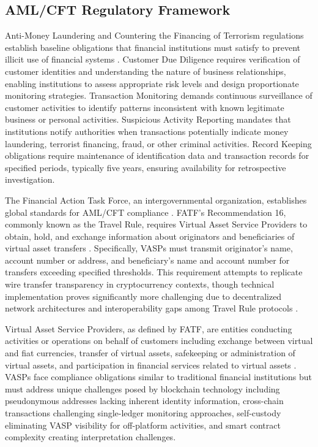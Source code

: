 \documentclass[conference,compsoc]{IEEEtran}
\begin{document}
\subsection{AML/CFT Regulatory Framework}

Anti-Money Laundering and Countering the Financing of Terrorism regulations establish baseline obligations that financial institutions must satisfy to prevent illicit use of financial systems \cite{financialactiontaskforcefatf2012internationalstandardscombating}. Customer Due Diligence requires verification of customer identities and understanding the nature of business relationships, enabling institutions to assess appropriate risk levels and design proportionate monitoring strategies. Transaction Monitoring demands continuous surveillance of customer activities to identify patterns inconsistent with known legitimate business or personal activities. Suspicious Activity Reporting mandates that institutions notify authorities when transactions potentially indicate money laundering, terrorist financing, fraud, or other criminal activities. Record Keeping obligations require maintenance of identification data and transaction records for specified periods, typically five years, ensuring availability for retrospective investigation.

The Financial Action Task Force, an intergovernmental organization, establishes global standards for AML/CFT compliance \cite{financialactiontaskforcefatf2012internationalstandardscombating}. FATF's Recommendation 16, commonly known as the Travel Rule, requires Virtual Asset Service Providers to obtain, hold, and exchange information about originators and beneficiaries of virtual asset transfers \cite{force2021updatedguidanceriskbased}. Specifically, VASPs must transmit originator's name, account number or address, and beneficiary's name and account number for transfers exceeding specified thresholds. This requirement attempts to replicate wire transfer transparency in cryptocurrency contexts, though technical implementation proves significantly more challenging due to decentralized network architectures and interoperability gaps among Travel Rule protocols \cite{force2021opportunitieschallengesnew}.

Virtual Asset Service Providers, as defined by FATF, are entities conducting activities or operations on behalf of customers including exchange between virtual and fiat currencies, transfer of virtual assets, safekeeping or administration of virtual assets, and participation in financial services related to virtual assets \cite{force2021updatedguidanceriskbased}. VASPs face compliance obligations similar to traditional financial institutions but must address unique challenges posed by blockchain technology including pseudonymous addresses lacking inherent identity information, cross-chain transactions challenging single-ledger monitoring approaches, self-custody eliminating VASP visibility for off-platform activities, and smart contract complexity creating interpretation challenges.
\end{document}
